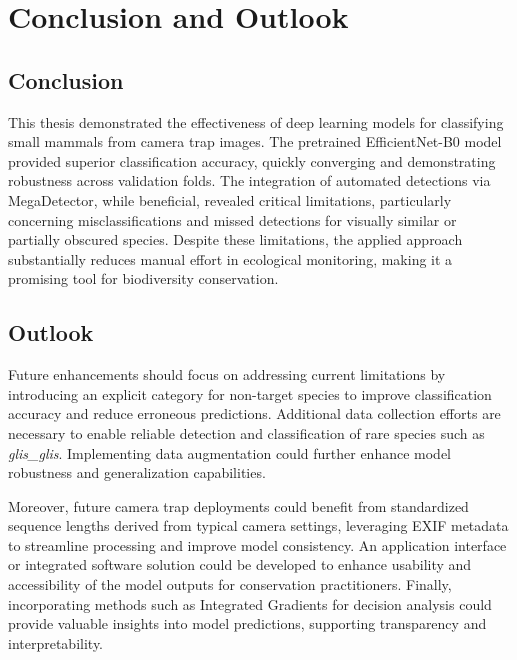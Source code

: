 


\section{Conclusion and Outlook}
\label{conclusion_outlook}

\subsection{Conclusion}

This thesis demonstrated the effectiveness of deep learning models for classifying small mammals from camera trap images.
The pretrained EfficientNet-B0 model provided superior classification accuracy, quickly converging and demonstrating robustness across validation folds.
The integration of automated detections via MegaDetector, while beneficial, revealed critical limitations, particularly concerning misclassifications and missed detections for visually similar or partially obscured species.
Despite these limitations, the applied approach substantially reduces manual effort in ecological monitoring, making it a promising tool for biodiversity conservation.


\subsection{Outlook}

Future enhancements should focus on addressing current limitations by introducing an explicit category for non-target species to improve classification accuracy and reduce erroneous predictions.
Additional data collection efforts are necessary to enable reliable detection and classification of rare species such as \textit{glis\_glis}.
Implementing data augmentation could further enhance model robustness and generalization capabilities.

Moreover, future camera trap deployments could benefit from standardized sequence lengths derived from typical camera settings, leveraging EXIF metadata to streamline processing and improve model consistency.
An application interface or integrated software solution could be developed to enhance usability and accessibility of the model outputs for conservation practitioners.
Finally, incorporating methods such as Integrated Gradients for decision analysis could provide valuable insights into model predictions, supporting transparency and interpretability.

